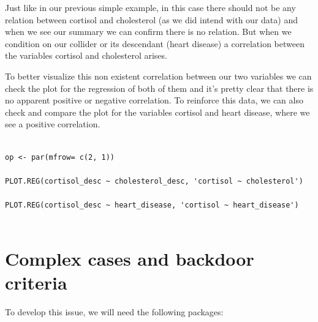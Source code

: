 \documentclass{article}
\begin{document}
Just like in our previous simple example, in this case there should not be any relation between cortisol and cholesterol (as we did intend with our data) and when we see our summary we can confirm there is no relation. But when we  condition on our collider or its descendant (heart disease) a correlation between the variables cortisol and cholesterol arises. 

To better visualize this non existent correlation between our two variables we can check the plot for the regression of both of them and it's pretty clear that there is no apparent positive or negative correlation. To reinforce this data, we can also check and compare the plot for the variables cortisol and heart disease, where we see a positive correlation.

\begin{lstlisting}

op <- par(mfrow= c(2, 1))

PLOT.REG(cortisol_desc ~ cholesterol_desc, 'cortisol ~ cholesterol')

PLOT.REG(cortisol_desc ~ heart_disease, 'cortisol ~ heart_disease')


\end{lstlisting}





\section{Complex cases and backdoor criteria}

To develop this issue, we will need the following packages:
\end{document}
